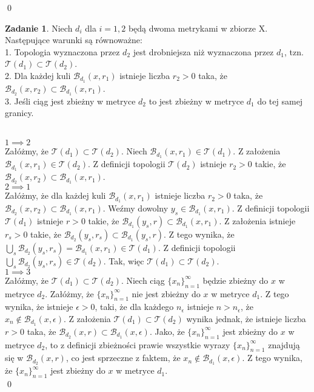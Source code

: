 \documentclass{article}
\theoremstyle{definition}%
\theoremstyle{theorem}
\newtheorem{zad}{Zadanie}
\renewenvironment{proof}{{\bfseries Rozwiązanie}}{\qed}
\begin{document}
\begin{proof}
		 \end{proof}
	
	\begin{zad}
		Niech $d_i$ dla $i = 1,2$ będą dwoma metrykami w zbiorze X. Następujące warunki są równoważne:\\
		1. Topologia wyznaczona przez $d_2$ jest drobniejsza niż wyznaczona przez $d_1$, tzn. $\mathcal{T}(d_1)\subset\mathcal{T}(d_2)$.\\
		2. Dla każdej kuli $\mathcal{B}_{d_1}(x,r_1)$ istnieje liczba $r_2>0$ taka, że $\mathcal{B}_{d_2}(x,r_2)\subset\mathcal{B}_{d_1}(x,r_1)$.\\
		3. Jeśli ciąg jest zbieżny w metryce $d_2$ to jest zbieżny w metryce $d_1$ do tej samej granicy.
			\end{zad}
		\begin{proof}
		\\	$1\implies2$\\
		Załóżmy, że $\mathcal{T}(d_1)\subset\mathcal{T}(d_2)$. Niech $\mathcal{B}_{d_1}(x,r_1)\in\mathcal{T}(d_1)$. Z założenia $\mathcal{B}_{d_1}(x,r_1)\in\mathcal{T}(d_2)$. Z definicji topologii $\mathcal{T}(d_2)$ istnieje $r_2>0$ takie, że\\
		$\mathcal{B}_{d_2}(x,r_2)\subset\mathcal{B}_{d_1}(x,r_1)$.\\
		$2\implies1$\\
		Załóżmy, że  dla każdej kuli $\mathcal{B}_{d_1}(x,r_1)$ istnieje liczba $r_2>0$ taka, że\\ $\mathcal{B}_{d_2}(x,r_2)\subset\mathcal{B}_{d_1}(x,r_1)$. Weźmy dowolny $y_s\in\mathcal{B}_{d_1}(x,r_1)$. Z definicji topologii $\mathcal{T}(d_1)$ istnieje $r>0$ takie, że $\mathcal{B}_{d_1}(y_s,r)\subset\mathcal{B}_{d_1}(x,r_1)$. Z założenia istnieje $r_s>0$ takie, że $\mathcal{B}_{d_2}(y_s,r_s)\subset\mathcal{B}_{d_1}(y_s,r)$. Z tego wynika, że $\bigcup_s \mathcal{B}_{d_2}(y_s,r_s) = \mathcal{B}_{d_1}(x,r_1)\in\mathcal{T}(d_1)$. Z definicji topologii $\bigcup_s \mathcal{B}_{d_2}(y_s,r_s)\in\mathcal{T}(d_2)$. Tak, więc $\mathcal{T}(d_1)\subset\mathcal{T}(d_2)$.\\
		$1\implies3$\\
		Załóżmy, że $\mathcal{T}(d_1)\subset\mathcal{T}(d_2)$. Niech ciąg $\{x_n\}_{n=1}^\infty$ będzie zbieżny do $x$ w metryce $d_2$. Załóżmy, że $\{x_n\}_{n=1}^\infty$ nie jest zbieżny do $x$ w metryce $d_1$. Z tego wynika, że istnieje $\epsilon>0$, taki, że dla każdego $n_{\epsilon}$ istnieje $n>n_{\epsilon}$, że $x_n\not\in\mathcal{B}_{d_1}(x,\epsilon)$. Z założenia $\mathcal{T}(d_1)\subset\mathcal{T}(d_2)$ wynika jednak, że istnieje liczba $r>0$ taka, że $\mathcal{B}_{d_2}(x,r)\subset\mathcal{B}_{d_1}(x,\epsilon)$. Jako, że $\{x_n\}_{n=1}^\infty$ jest zbieżny do $x$ w metryce $d_2$, to z definicji zbieżności prawie wszystkie wyrazy $\{x_n\}_{n=1}^\infty$ znajdują się w $\mathcal{B}_{d_2}(x,r)$, co jest sprzeczne z faktem, że $x_n\not\in\mathcal{B}_{d_1}(x,\epsilon)$. Z tego wynika, że $\{x_n\}_{n=1}^\infty$ jest zbieżny do $x$ w metryce $d_1$.\\

\end{proof}
\end{document}
